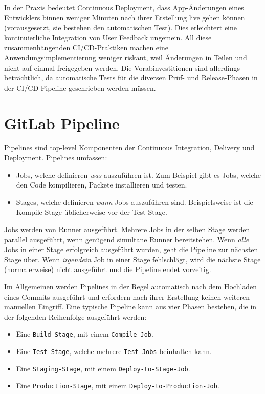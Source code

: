 In der Praxis bedeutet Continuous Deployment, dass App-Änderungen eines Entwicklers binnen weniger Minuten nach ihrer Erstellung live gehen können (vorausgesetzt, sie bestehen den automatischen Test). Dies erleichtert eine kontinuierliche Integration von User Feedback ungemein. All diese zusammenhängenden CI/CD-Praktiken machen eine Anwendungsimplementierung weniger riskant, weil Änderungen in Teilen und nicht auf einmal freigegeben werden. Die Vorabinvestitionen sind allerdings beträchtlich, da automatische Tests für die diversen Prüf- und Release-Phasen in der CI/CD-Pipeline geschrieben werden müssen.\autocite{whatIsCICD}

\section{GitLab Pipeline}

Pipelines sind top-level Komponenten der Continuous Integration, Delivery und Deployment. Pipelines umfassen:\autocite{gitlabPipelines}

\begin{itemize}
	\item Jobs, welche definieren \textit{was} auszuführen ist. Zum Beispiel gibt es Jobs, welche den Code kompilieren, Packete installieren und testen.
	\item Stages, welche definieren \textit{wann} Jobs auszuführen sind. Beispielsweise ist die Kompile-Stage üblicherweise vor der Test-Stage.
\end{itemize}

Jobs werden von Runner ausgeführt. Mehrere Jobs in der selben Stage werden parallel ausgeführt, wenn genügend simultane Runner bereitstehen.
Wenn \textit{alle} Jobs in einer Stage erfolgreich ausgeführt wurden, geht die Pipeline zur nächsten Stage über.
Wenn \textit{irgendein} Job in einer Stage fehlschlägt, wird die nächste Stage (normalerweise) nicht ausgeführt und die Pipeline endet vorzeitig.\autocite{gitlabPipelines}

Im Allgemeinen werden Pipelines in der Regel automatisch  nach dem Hochladen eines Commits ausgeführt und erfordern nach ihrer Erstellung keinen weiteren manuellen Eingriff.
Eine typische Pipeline kann aus vier Phasen bestehen, die in der folgenden Reihenfolge ausgeführt werden:\autocite{gitlabPipelines}

\begin{itemize}
	\item Eine \texttt{Build-Stage}, mit einem \texttt{Compile-Job}.
	\item Eine \texttt{Test-Stage}, welche mehrere \texttt{Test-Jobs} beinhalten kann.
	\item Eine \texttt{Staging-Stage}, mit einem \texttt{Deploy-to-Stage-Job}.
	\item Eine \texttt{Production-Stage}, mit einem \texttt{Deploy-to-Production-Job}.
\end{itemize}


